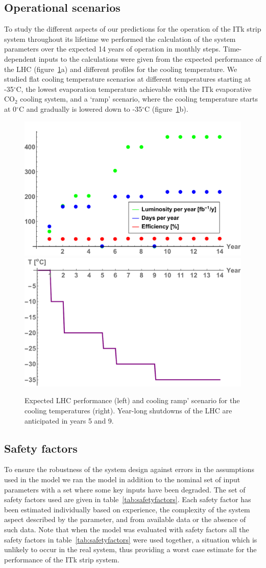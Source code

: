 
\subsection{Operational scenarios}
To study the different aspects of our predictions for the operation of the ITk strip system throughout its lifetime we performed the calculation of the system parameters over the expected 14 years of operation in monthly steps. Time-dependent inputs to the calculations were given from the expected performance of the LHC (figure~\ref{fig:opscenarios}a) and different profiles for the cooling temperature. We studied flat cooling temperature scenarios at different temperatures starting at -35$^\circ$C, the lowest evaporation temperature achievable with the ITk evaporative CO$_2$ cooling system, and a `ramp' scenario, where the cooling temperature starts at 0$^\circ$C and gradually is lowered down to -35$^\circ$C (figure~\ref{fig:opscenarios}b).

\begin{figure}[ht]
\centering
\includegraphics[width=0.4\linewidth]{figures/LHCperformance.pdf}\quad
\includegraphics[width=0.4\linewidth]{figures/coolingramp.pdf}
\caption{Expected LHC performance (left) and cooling ramp' scenario for the cooling temperatures (right). Year-long shutdowns of the LHC are anticipated in years 5 and 9.}
\label{fig:opscenarios}
\end{figure}

\subsection{Safety factors}
To ensure the robustness of the system design against errors in the assumptions used in the model we ran the model in addition to the nominal set of input parameters with a set where some key inputs have been degraded. The set of safety factors used are given in table~\ref{tab:safetyfactors}. Each safety factor has been estimated individually based on experience, the complexity of the system aspect described by the parameter, and from available data or the absence of such data. Note that when the model was evaluated with safety factors all the safety factors in table~\ref{tab:safetyfactors} were used together, a situation which is unlikely to occur in the real system, thus providing a worst case estimate for the performance of the ITk strip system.

